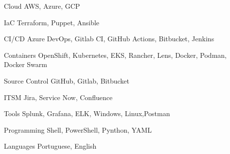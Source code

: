 

\begin{cvskills}

  \cvskill
    {Cloud} %
    {AWS, Azure, GCP} %

  \cvskill
    {IaC} %
    {Terraform, Puppet, Ansible} %

  \cvskill
    {CI/CD} %
    {Azure DevOps, Gitlab CI, GitHub Actions, Bitbucket, Jenkins} %

  \cvskill
    {Containers} %
    {OpenShift, Kubernetes, EKS, Rancher, Lens, Docker, Podman, Docker Swarm} %

  \cvskill
    {Source Control} %
    {GitHub, Gitlab, Bitbucket} %

  \cvskill
    {ITSM} %
    {Jira, Service Now, Confluence} %

  \cvskill
    {Tools} %
    {Splunk, Grafana, ELK, Windows, Linux,Postman} %

  \cvskill
    {Programming} %
    {Shell, PowerShell, Pynthon, YAML} %

  \cvskill
    {Languages} %
    {Portuguese, English} %

\end{cvskills}